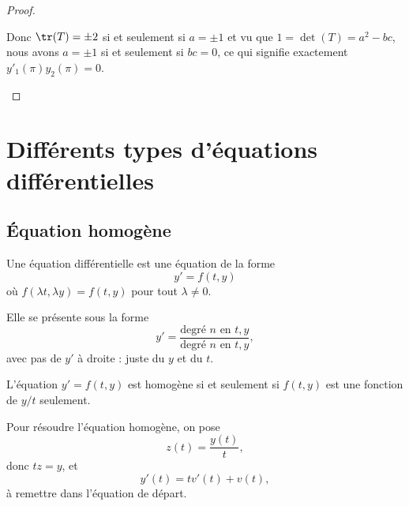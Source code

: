 \begin{proof}
\begin{enumerate}
		      Donc \( \tr(T)=\pm 2\) si et seulement si \( a=\pm 1\) et vu que \( 1=\det(T)=a^2-bc\), nous avons \( a=\pm 1\) si et seulement si \( bc=0\), ce qui signifie exactement \( y'_1(\pi)y_2(\pi)=0\).
	\end{enumerate}
\end{proof}

\section{Différents types d'équations différentielles}

\subsection{Équation homogène}
\label{SubSecEqDiffHomo}

Une équation différentielle  est une équation de la forme
\begin{equation}
	y'=f(t,y)
\end{equation}
où \( f(\lambda t,\lambda y)=f(t,y)\) pour tout \( \lambda\neq 0\).

Elle se présente sous la forme
\begin{equation}
	y'=\frac{ \text{degré } n \text{ en } t,y }{ \text{degré } n \text{ en } t,y },
\end{equation}
avec pas de \( y'\) à droite : juste du \( y\) et du \( t\).

\begin{lemma}
	L'équation \( y'=f(t,y)\) est homogène si et seulement si \( f(t,y)\) est une fonction de \( y/t\) seulement.
\end{lemma}
Pour résoudre l'équation homogène, on pose
\begin{equation}		\label{EqDiffHomoPoser}
	z(t)=\frac{ y(t) }{ t },
\end{equation}
donc \( tz=y\), et
\begin{equation}
	y'(t)=tv'(t)+v(t),
\end{equation}
à remettre dans l'équation de départ.
